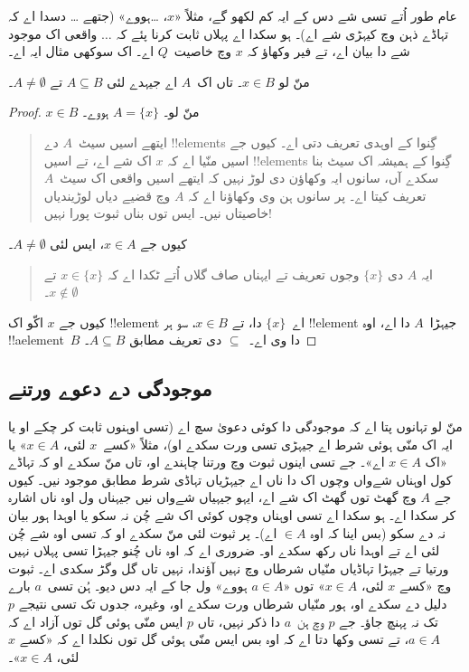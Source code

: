 \documentclass[../../../include/open-logic-section]{subfiles}
\begin{document}
عام طور اُتے تسی شے دس کے ایہ کم لکھو گے، مثلاً «$x$، \dots ہووے» (جتھے \dots{} دسدا اے کہ تہاڈے ذہن وچ کیہڑی شے اے)۔ ہو سکدا اے پہلاں ثابت کرنا پئے کہ $\dots$ واقعی اک موجود شے دا بیان اے، تے فیر وکھاؤ کہ $x$ وچ خاصیت~$Q$ اے۔ اک سوکھی مثال ایہ اے۔

\begin{prop}
  منّ لو $x \in B$۔ تاں اک~$A$ اے جیہدے لئی $A \subseteq
  B$ تے $A \neq \emptyset$۔
\end{prop}

\begin{proof}
  $x \in B$ منّ لو۔ $A = \{x\}$ ہووے۔
  \begin{quote}
    ایتھے اسیں سیٹ~$A$ دے !!{element}s گِنوا کے اوہدی تعریف دتی اے۔ کیوں جے اسیں منّیا اے کہ $x$ اک شے اے، تے اسیں !!{element}s گِنوا کے ہمیشہ اک سیٹ بنا سکدے آں، سانوں ایہ وکھاؤن دی لوڑ نہیں کہ ایتھے اسیں واقعی اک سیٹ~$A$ تعریف کیتا اے۔ پر سانوں ہن وی وکھاؤنا اے کہ $A$ وچ قضیے دیاں لوڑیندیاں خاصیتاں نیں۔ ایس توں بناں ثبوت پورا نہیں!{}
  \end{quote}
  کیوں جے $x \in A$، ایس لئی $A \neq \emptyset$۔
  \begin{quote}
    ایہ $A$ دی $\{x\}$ وجوں تعریف تے ایہناں صاف گلاں اُتے ٹکدا اے کہ $x \in \{x\}$ تے $x \notin \emptyset$۔
  \end{quote}
  کیوں جے $x$ اکّو اک !!{element} اے~$\{x\}$ دا، تے $x \in B$، سو ہر !!{element} جیہڑا~$A$ دا اے، اوہ !!a{element}~$B$ دا وی اے۔~$\subseteq$ دی تعریف مطابق $A \subseteq B$۔
\end{proof}

\subsection{موجودگی دے دعوے ورتنے}

منّ لو تہانوں پتا اے کہ موجودگی دا کوئی دعویٰ سچ اے (تسی اوہنوں ثابت کر چکے او یا ایہ اک منّی ہوئی شرط اے جیہڑی تسی ورت سکدے او)، مثلاً «کسے~$x$ لئی، $x \in A$» یا «اک $x \in A$ اے»۔ جے تسی اینوں ثبوت وچ ورتنا چاہندے او، تاں منّ سکدے او کہ تہاڈے کول اوہناں شےواں وچوں اک دا ناں اے جیہڑیاں تہاڈی شرط مطابق موجود نیں۔ کیوں جے $A$ وچ گھٹ توں گھٹ اک شے اے، ایہو جیہیاں شےواں نیں جیہناں ول اوہ ناں اشارہ کر سکدا اے۔ ہو سکدا اے تسی اوہناں وچوں کوئی اک شے چُن نہ سکو یا اوہدا ہور بیان نہ دے سکو (بس اینا کہ اوہ $\in A$ اے)۔ پر ثبوت لئی منّ سکدے او کہ تسی اوہ شے چُن لئی اے تے اوہدا ناں رکھ سکدے او۔ ضروری اے کہ اوہ ناں چُنو جیہڑا تسی پہلاں نہیں ورتیا تے جیہڑا تہاڈیاں منّیاں شرطاں وچ نہیں آؤندا، نہیں تاں گل وگڑ سکدی اے۔ ثبوت وچ «کسے $x$ لئی، $x \in A$» توں «$a
\in A$ ہووے» ول جا کے ایہ دس دیو۔ ہُن تسی~$a$ بارے دلیل دے سکدے او، ہور منّیاں شرطاں ورت سکدے او، وغیرہ، جدوں تک تسی نتیجے $p$ تک نہ پہنچ جاؤ۔ جے $p$ وچ ہن~$a$ دا ذکر نہیں، تاں $p$ ایس منّی ہوئی گل توں آزاد اے کہ $a \in A$، تے تسی وکھا دتا اے کہ اوہ بس ایس منّی ہوئی گل توں نکلدا اے کہ «کسے $x$ لئی، $x \in A$»۔
\end{document}

